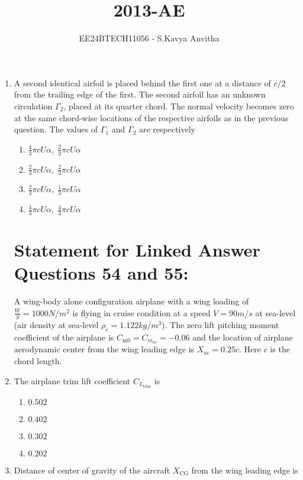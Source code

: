 \documentclass[journal]{IEEEtran}
\newcommand{\questionref}[1]{{ #1}}
\begin{document}

\vspace{3cm}

\title{2013-AE}
\author{EE24BTECH11056 - S.Kavya Anvitha}
\maketitle
\bigskip

\renewcommand{\thefigure}{\theenumi}
\renewcommand{\thetable}{\theenumi}
\begin{enumerate}

\item A second identical airfoil is placed behind the first one at a distance of $c/2$ from the trailing edge of the first. The second airfoil has an unknown circulation $\Gamma_2$, placed at its quarter chord. The normal velocity becomes zero at the same chord-wise locations of the respective airfoils as in the previous question. The values of $\Gamma_1$ and $\Gamma_2$ are respectively

\begin{enumerate}
    \item $\frac{4}{3} \pi c U \alpha, \; \frac{2}{3} \pi c U \alpha$
    \item $\frac{2}{3} \pi c U \alpha, \; \frac{2}{3} \pi c U \alpha$
    \item $\frac{2}{3} \pi c U \alpha, \; \frac{1}{3} \pi c U \alpha$
    \item $\frac{4}{3} \pi c U \alpha, \; \frac{4}{3} \pi c U \alpha$\\
\end{enumerate}
\section{Statement for Linked Answer Questions \questionref{54} and \questionref{55}:} A wing-body alone configuration airplane with a wing loading of $\frac{W}{S} = 1000N/m^2$ is flying in cruise condition at a speed $V = 90m/s$ at sea-level (air density at sea-level $\rho_e = 1.122kg/m^3$). The zero lift pitching moment coefficient of the airplane is $C_{\text{m0}} = C_{m_{\text{ac}}} = -0.06$ and the location of airplane aerodynamic center from the wing leading edge is $X_{\text{ac}} = 0.25c$. Here $c$ is the chord length.
\item The airplane trim lift coefficient $C_{L_{\text{trim}}}$ is

\begin{enumerate}
    \item $0.502$
    \item $0.402$
    \item $0.302$
    \item $0.202$\\
\end{enumerate}
\item Distance of center of gravity of the aircraft $X_{\text{CG}}$ from the wing leading edge is


\end{enumerate}
\end{document}

